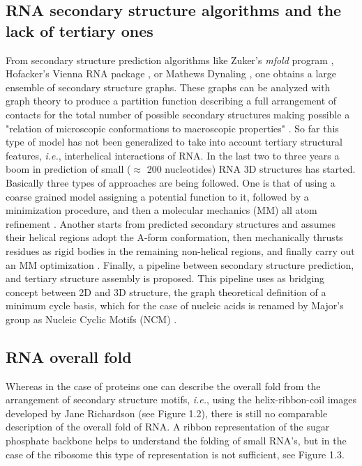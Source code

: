 \subsection{RNA  secondary  structure   algorithms  and  the  lack  of
 tertiary ones}
From   secondary   structure   prediction  algorithms   like   Zuker's
\textit{mfold} program \cite{zuker2003}, Hofacker's Vienna RNA package
\cite{hofacker1994},  or   Mathews  Dynaling  \cite{mathews2002},  one
obtains a large ensemble  of secondary structure graphs.  These graphs
can  be analyzed  with graph  theory to  produce a  partition function
describing  a full  arrangement of  contacts for  the total  number of
possible   secondary  structures  making   possible  a   "relation  of
microscopic      conformations     to      macroscopic     properties"
\cite{chen2000}. So far this type of model has not been generalized to
take  into   account  tertiary  structural   features,  \textit{i.e.},
interhelical interactions  of RNA.  In the  last two to  three years a
boom  in  prediction  of  small  ($\approx$ 200  nucleotides)  RNA  3D
structures has started. Basically  three types of approaches are being
followed.  One  is that  of using a  coarse grained model  assigning a
potential function  to it, followed  by a minimization  procedure, and
then  a molecular  mechanics (MM)  all atom  refinement \cite{das2007,
  ding2008,  jonikas2009a}. Another  starts  from predicted  secondary
structures  and  assumes  their   helical  regions  adopt  the  A-form
conformation, then  mechanically thrusts  residues as rigid  bodies in
the  remaining  non-helical  regions,  and  finally carry  out  an  MM
optimization   \cite{martinez2008}.   Finally,   a   pipeline  between
secondary  structure prediction,  and tertiary  structure  assembly is
proposed. This  pipeline uses  as bridging concept  between 2D  and 3D
structure, the  graph theoretical definition of a  minimum cycle basis,
which for  the case of  nucleic acids is  renamed by Major's  group as
Nucleic Cyclic Motifs (NCM) \cite{parisien2008}.

\subsection{RNA overall fold}
Whereas in the case of proteins one can describe the overall fold from
the  arrangement of secondary  structure motifs,  \textit{i.e.}, using
the   helix-ribbon-coil   images    developed   by   Jane   Richardson
\cite{richardson2000} (see  Figure 1.2), there is  still no comparable
description of the overall fold of RNA. A ribbon representation of the
sugar  phosphate backbone  helps to  understand the  folding  of small
RNA's, but in the case of  the ribosome this type of representation is
not sufficient, see Figure 1.3.

